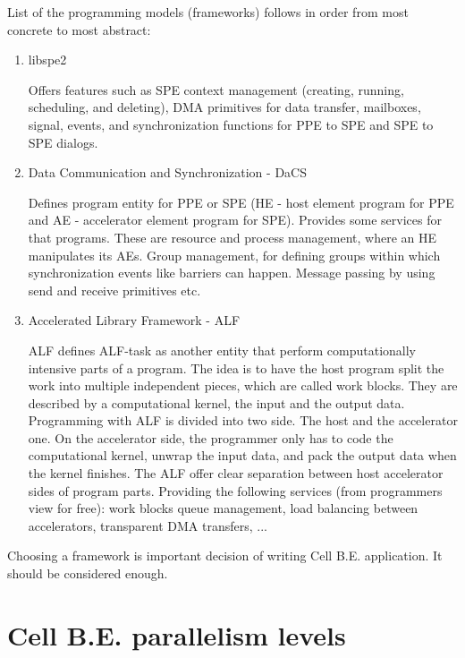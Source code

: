 List of the programming models (frameworks) follows in order from most concrete to most abstract:
\begin{enumerate}
\item {libspe2}
\par
Offers features such as SPE context management (creating, running, scheduling, and deleting), DMA primitives for data transfer, mailboxes, signal, events, and synchronization functions for PPE to SPE and SPE to SPE dialogs.

\item {Data Communication and Synchronization - DaCS}
\par
Defines program entity for PPE or SPE (HE - host element program for PPE and AE - accelerator element program for SPE).
Provides some services for that programs.
These are resource and process management, where an HE manipulates its AEs.
Group management, for defining groups within which synchronization events like barriers can happen.
Message passing by using send and receive primitives etc.

\item {Accelerated Library Framework - ALF}
\par
ALF defines ALF-task as another entity that perform computationally intensive parts of a program.
The idea is to have the host program split the work into multiple independent pieces, which are called work blocks.
They are described by a computational kernel, the input and the output data. Programming with ALF is divided into two side.
The host and the accelerator one.
On the accelerator side, the programmer only has to code the computational kernel, unwrap the input data, and pack the output data when the kernel finishes.
The ALF offer clear separation between host accelerator sides of program parts.
Providing the following services (from programmers view for free): work blocks queue management, load balancing between accelerators, transparent DMA transfers, ...

\end{enumerate}

Choosing a framework is important decision of writing Cell B.E. application.
 It should be considered enough.

\section {Cell B.E. parallelism levels}

